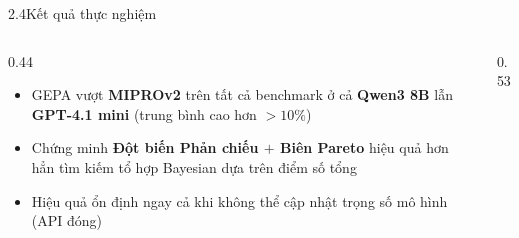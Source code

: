 \begin{frame}{2.4\quad Kết quả thực nghiệm}
  \begin{columns}[T,onlytextwidth]
    \begin{column}{0.44\textwidth}
      \begin{itemize}\setlength{\itemsep}{0.55em}
        \item GEPA vượt \textbf{MIPROv2} trên tất cả benchmark ở cả \textbf{Qwen3 8B}
              lẫn \textbf{GPT-4.1 mini} (trung bình cao hơn $>10\%$)
        \item Chứng minh \textbf{Đột biến Phản chiếu $+$ Biên Pareto} hiệu quả hơn hẳn
              tìm kiếm tổ hợp Bayesian dựa trên điểm số tổng
        \item Hiệu quả ổn định ngay cả khi không thể cập nhật trọng số mô hình (API đóng)
      \end{itemize}
    \end{column}
    \begin{column}{0.53\textwidth}
      \centering
      \par{}
    \end{column}
  \end{columns}
\end{frame}

